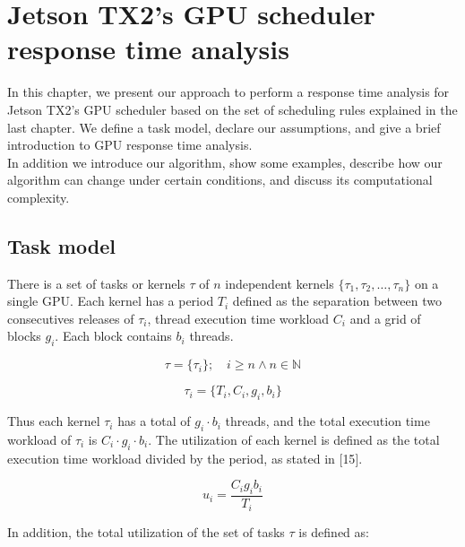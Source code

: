 \documentclass[
  12pt,
  a4paperpaper,
]{report}
\begin{document}
\newpage

\hypertarget{jetson-tx2s-gpu-scheduler-response-time-analysis}{%
\chapter{Jetson TX2's GPU scheduler response time
analysis}\label{jetson-tx2s-gpu-scheduler-response-time-analysis}}

In this chapter, we present our approach to perform a response time
analysis for Jetson TX2's GPU scheduler based on the set of scheduling
rules explained in the last chapter. We define a task model, declare our
assumptions, and give a brief introduction to GPU response time
analysis.\\
In addition we introduce our algorithm, show some examples, describe how
our algorithm can change under certain conditions, and discuss its
computational complexity.

\hypertarget{task-model}{%
\section{Task model}\label{task-model}}

There is a set of tasks or kernels \(\tau\) of \(n\) independent kernels
\(\{\tau_1, \tau_2, \ldots, \tau_n\}\) on a single GPU. Each kernel has
a period \(T_i\) defined as the separation between two consecutives
releases of \(\tau_i\), thread execution time workload \(C_i\) and a
grid of blocks \(g_i\). Each block contains \(b_i\) threads.

\begin{equation} 
\tau = \{ \tau_i \}; \quad i \geq n \wedge n \in \mathbb{N}
\end{equation}

\begin{equation} 
\tau_i = \{ T_i,  C_i,  g_i,  b_i \}
\label{eq:task_def}
\end{equation}

Thus each kernel \(\tau_i\) has a total of \(g_i\cdot b_i\) threads, and
the total execution time workload of \(\tau_i\) is
\(C_i \cdot g_i \cdot b_i\). The utilization of each kernel is defined
as the total execution time workload divided by the period, as stated in
{[}15{]}.

\begin{equation} 
u_i = \frac{C_i g_i b_i}{T_i}
\label{eq:task_utilization}
\end{equation}

In addition, the total utilization of the set of tasks \(\tau\) is
defined as:
\end{document}
